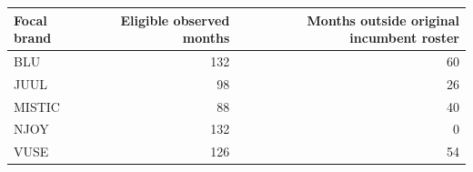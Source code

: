 \documentclass[10pt,]{article}
\begin{document}
\begin{longtable}[]{@{}lrr@{}}
\toprule
\begin{minipage}[b]{0.15\columnwidth}\raggedright\strut
Focal brand\strut
\end{minipage} & \begin{minipage}[b]{0.30\columnwidth}\raggedleft\strut
Eligible observed months\strut
\end{minipage} & \begin{minipage}[b]{0.46\columnwidth}\raggedleft\strut
Months outside original incumbent roster\strut
\end{minipage}\tabularnewline
\midrule
\endhead
\begin{minipage}[t]{0.15\columnwidth}\raggedright\strut
BLU\strut
\end{minipage} & \begin{minipage}[t]{0.30\columnwidth}\raggedleft\strut
132\strut
\end{minipage} & \begin{minipage}[t]{0.46\columnwidth}\raggedleft\strut
60\strut
\end{minipage}\tabularnewline
\begin{minipage}[t]{0.15\columnwidth}\raggedright\strut
JUUL\strut
\end{minipage} & \begin{minipage}[t]{0.30\columnwidth}\raggedleft\strut
98\strut
\end{minipage} & \begin{minipage}[t]{0.46\columnwidth}\raggedleft\strut
26\strut
\end{minipage}\tabularnewline
\begin{minipage}[t]{0.15\columnwidth}\raggedright\strut
MISTIC\strut
\end{minipage} & \begin{minipage}[t]{0.30\columnwidth}\raggedleft\strut
88\strut
\end{minipage} & \begin{minipage}[t]{0.46\columnwidth}\raggedleft\strut
40\strut
\end{minipage}\tabularnewline
\begin{minipage}[t]{0.15\columnwidth}\raggedright\strut
NJOY\strut
\end{minipage} & \begin{minipage}[t]{0.30\columnwidth}\raggedleft\strut
132\strut
\end{minipage} & \begin{minipage}[t]{0.46\columnwidth}\raggedleft\strut
0\strut
\end{minipage}\tabularnewline
\begin{minipage}[t]{0.15\columnwidth}\raggedright\strut
VUSE\strut
\end{minipage} & \begin{minipage}[t]{0.30\columnwidth}\raggedleft\strut
126\strut
\end{minipage} & \begin{minipage}[t]{0.46\columnwidth}\raggedleft\strut
54\strut
\end{minipage}\tabularnewline
\bottomrule
\end{longtable}
\end{document}
